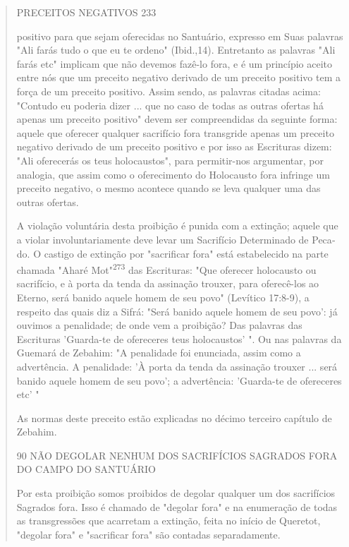 \begin{quote}
PRECEITOS NEGATIVOS 233

positivo para que sejam oferecidas no Santuário, expresso em Suas
palavras "Ali farás tudo o que eu te ordeno" (Ibid.,14). Entretanto as
palavras "Ali farás etc" implicam que não devemos fazê-lo fora, e é um
princípio aceito entre nós que um preceito negativo derivado de um
preceito positivo tem a força de um pre­ceito positivo. Assim sendo, as
palavras citadas acima: "Contudo eu poderia dizer ... que no caso de
todas as outras ofertas há apenas um preceito positivo" devem ser
compreendidas da seguinte forma: aquele que oferecer qualquer
sa­crifício fora transgride apenas um preceito negativo derivado de um
preceito positivo e por isso as Escrituras dizem: "Ali oferecerás os
teus holocaustos", para permitir-nos argumentar, por analogia, que assim
como o oferecimento do Holocausto fora infringe um preceito negativo, o
mesmo acontece quando se leva qualquer uma das outras ofertas.

A violação voluntária desta proibição é punida com a extinção; aquele
que a violar involuntariamente deve levar um Sacrifício Determinado de
Peca­do. O castigo de extinção por "sacrificar fora" está estabelecido
na parte cha­mada "Aharé Mot"\textsuperscript{273} das Escrituras: "Que
oferecer holocausto ou sacrifício, e à porta da tenda da assinação
trouxer, para oferecê-los ao Eterno, será banido aquele homem de seu
povo" (Levítico 17:8-9), a respeito das quais diz a Sifrá: "Será banido
aquele homem de seu povo': já ouvimos a penalidade; de onde vem a
proibição? Das palavras das Escrituras 'Guarda-te de ofereceres teus
ho­locaustos' ". Ou nas palavras da Guemará de Zebahim: "A penalidade
foi enun­ciada, assim como a advertência. A penalidade: 'À porta da
tenda da assinação trouxer ... será banido aquele homem de seu povo'; a
advertência: 'Guarda-te de ofereceres etc' "

As normas deste preceito estão explicadas no décimo terceiro capí­tulo
de Zebahim.

90 NÃO DEGOLAR NENHUM DOS SACRIFÍCIOS SAGRADOS FORA DO CAMPO DO
SANTUÁRIO

Por esta proibição somos proibidos de degolar qualquer um dos
sa­crifícios Sagrados fora. Isso é chamado de "degolar fora" e na
enumeração de todas as transgressões que acarretam a extinção, feita no
início de Queretot, "degolar fora" e "sacrificar fora" são contadas
separadamente.


\end{quote}
